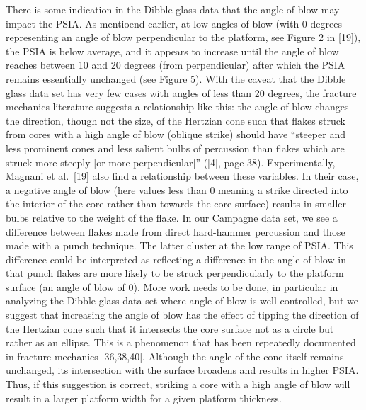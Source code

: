 \documentclass[10pt,letterpaper]{article}
\begin{document}
There is some indication in the Dibble glass data that the angle of blow
may impact the PSIA. As mentioend earlier, at low angles of blow (with 0
degrees representing an angle of blow perpendicular to the platform, see
Figure 2 in {[}19{]}), the PSIA is below average, and it appears to
increase until the angle of blow reaches between 10 and 20 degrees (from
perpendicular) after which the PSIA remains essentially unchanged (see
Figure 5). With the caveat that the Dibble glass data set has very few
cases with angles of less than 20 degrees, the fracture mechanics
literature suggests a relationship like this: the angle of blow changes
the direction, though not the size, of the Hertzian cone such that
flakes struck from cores with a high angle of blow (oblique strike)
should have ``steeper and less prominent cones and less salient bulbs of
percussion than flakes which are struck more steeply {[}or more
perpendicular{]}'' ({[}4{]}, page 38). Experimentally, Magnani et
al.~{[}19{]} also find a relationship between these variables. In their
case, a negative angle of blow (here values less than 0 meaning a strike
directed into the interior of the core rather than towards the core
surface) results in smaller bulbs relative to the weight of the flake.
In our Campagne data set, we see a difference between flakes made from
direct hard-hammer percussion and those made with a punch technique. The
latter cluster at the low range of PSIA. This difference could be
interpreted as reflecting a difference in the angle of blow in that
punch flakes are more likely to be struck perpendicularly to the
platform surface (an angle of blow of 0). More work needs to be done, in
particular in analyzing the Dibble glass data set where angle of blow is
well controlled, but we suggest that increasing the angle of blow has
the effect of tipping the direction of the Hertzian cone such that it
intersects the core surface not as a circle but rather as an ellipse.
This is a phenomenon that has been repeatedly documented in fracture
mechanics {[}36,38,40{]}. Although the angle of the cone itself remains
unchanged, its intersection with the surface broadens and results in
higher PSIA. Thus, if this suggestion is correct, striking a core with a
high angle of blow will result in a larger platform width for a given
platform thickness.
\end{document}
